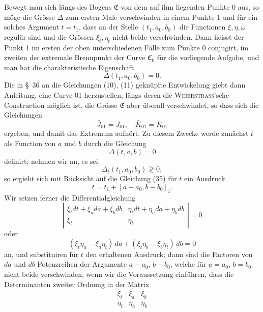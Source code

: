 \documentclass[11pt,a4paper,leqno]{article}
\begin{document}
Bewegt man sich längs des Bogens $\mathfrak{C}$ von dem auf ihm liegenden Punkte 0 aus, so möge die Grösse $\Delta$ zum ersten Male verschwinden in einem Punkte 1 und für ein solches Argument $t=t_1$, dass an der Stelle $(t_1,a_0,b_0)$ die Functionen $\xi,\eta,\omega$ regulär sind und die Grössen $\xi_t,\eta_t$ nicht beide verschwinden. Dann heisst der Punkt 1 im ersten der oben unterschiedenen Fälle zum Punkte 0 conjugirt, im zweiten der extremale Brennpunkt der Curve $\mathfrak{C}_0$ für die vorliegende Aufgabe, und man hat die charakteristische Eigenschaft
\begin{equation}\tag{35}
\Delta(t_1,a_0,b_0)=0.
\end{equation}
Die in \S~36 an die Gleichungen (10), (11) geknüpfte Entwickelung giebt dann Anleitung, eine Curve 01 herzustellen, längs
 deren die \textsc{Weierstrass}'sche Construction möglich ist, die Grösse $\mathfrak{E}$ aber überall verschwindet, so dass sich die Gleichungen
\begin{equation}\tag{36}
\bar J_{01}=J_{01},\quad \bar K_{01}=K_{01}
\end{equation}
ergeben, und damit das Extremum aufhört. Zu diesem Zwecke werde zunächst $t$ als Function von $a$ und $b$ durch die Gleichung
\begin{equation}\tag{37}
\Delta(t,a,b)=0
\end{equation}
definirt; nehmen wir an, es sei
\[
\Delta_t(t_1,a_0,b_0)\gtrless 0,
\]
so ergiebt sich mit Rücksicht auf die Gleichung (35) für $t$ ein Ausdruck
\[
t=t_1+[a-a_0,b-b_0]_1.
\]
Wir setzen ferner die Differentialgleichung
\[
\left|\begin{array}{cc}
\xi_tdt+\xi_a da+\xi_b db&\eta_tdt+\eta_a da+\eta_b db\\[.6ex]
\xi_t&\eta_t
\end{array}\right|=0
\]
oder
\begin{equation}\tag{38}
(\xi_t\eta_a-\xi_a\eta_t)\,da+(\xi_t\eta_b-\xi_b\eta_t)\,db=0
\end{equation}
an, und substituiren für $t$ den erhaltenen Ausdruck; dann sind die Factoren von $da$ und $db$ Potenzreihen der Argumente $a-a_0$, $b-b_0$, welche für $a=a_0$, $b=b_0$ nicht beide verschwinden, wenn wir die Voraussetzung einführen, dass die Determinanten zweiter Ordnung in der Matrix
\begin{equation}\tag{39}
\begin{array}{ccc}
\xi_t&\xi_a&\xi_b\\
\eta_t&\eta_a&\eta_b
\end{array}
\end{equation}
\end{document}

